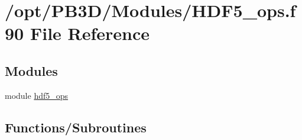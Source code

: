 \hypertarget{HDF5__ops_8f90}{}\section{/opt/\+P\+B3\+D/\+Modules/\+H\+D\+F5\+\_\+ops.f90 File Reference}
\label{HDF5__ops_8f90}
\subsection*{Modules}
\begin{DoxyCompactItemize}
\item 
module \hyperlink{namespacehdf5__ops}{hdf5\+\_\+ops}
\end{DoxyCompactItemize}
\subsection*{Functions/\+Subroutines}
